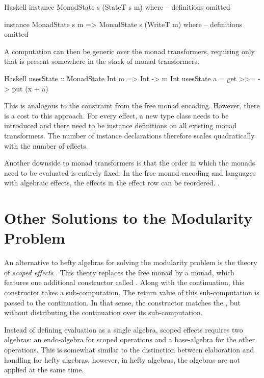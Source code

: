 \begin{lst}{Haskell}
instance MonadState s (StateT s m) where
  -- definitions omitted

instance MonadState s m => MonadState s (WriteT m) where
  -- definitions omitted
\end{lst}
%
A computation can then be generic over the monad transformers, requiring only that  is present somewhere in the stack of monad transformers.

\begin{lst}{Haskell}
usesState :: MonadState Int m => Int -> m Int
usesState a = get >>= \x -> put (x + a)
\end{lst}
%
This is analogous to the  constraint from the free monad encoding. However, there is a cost to this approach. For every effect, a new type class needs to be introduced and there need to be instance definitions on all existing monad transformers. The number of instance declarations therefore scales quadratically with the number of effects.

Another downside to monad transformers is that the order in which the monads need to be evaluated is entirely fixed. In the free monad encoding and languages with algebraic effects, the effects in the effect row can be reordered. .

\section{Other Solutions to the Modularity Problem}

An alternative to hefty algebras for solving the modularity problem is the theory of \emph{scoped effects} \autocite{wu_effect_2014,pirog_syntax_2018,yang_structured_2022}. This theory replaces the free monad by a  monad, which features one additional constructor called . Along with the continuation, this constructor takes a sub-computation. The return value of this sub-computation is passed to the continuation. In that sense, the  constructor matches the \hs{>>=}, but without distributing the continuation over its sub-computation.

Instead of defining evaluation as a single algebra, scoped effects requires two algebras: an endo-algebra for scoped operations and a base-algebra for the other operations. This is somewhat similar to the distinction between elaboration and handling for hefty algebras, however, in hefty algebras, the algebras are not applied at the same time.

